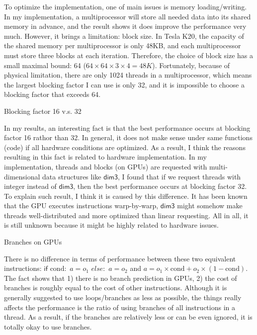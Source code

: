 \documentclass[12pt]{article}
\makeatletter
\renewenvironment{itemize}
{\list{$\bullet$}{\leftmargin\z@ \labelwidth\z@ \itemindent-\leftmargin
\let\makelabel\descriptionlabel}}
{\endlist}
\makeatother
\begin{document}
\begin{itemize}
    \begin{flushleft}
        To optimize the implementation, one of main issues is memory loading/writing. In my implementation, a multiprocessor will store all needed data into its shared memory in advance, and the result shows it does improve the performance very much. However, it brings a limitation: block size. In Tesla K20, the capacity of the shared memory per multiprocessor is only 48KB, and each multiprocessor must store three blocks at each iteration. Therefore, the choice of block size has a small maximal bound: 64 ($64 \times 64 \times 3 \times 4 = 48K$). Fortunately, because of physical limitation, there are only 1024 threads in a multiprocessor, which means the largest blocking factor I can use is only 32, and it is impossible to choose a blocking factor that exceeds 64.
    \end{flushleft}
    \item Blocking factor 16 v.s. 32
    \begin{flushleft}
        In my results, an interesting fact is that the best performance occurs at blocking factor 16 rathor than 32. In general, it does not make sense under same functions (code) if all hardware conditions are optimized. As a result, I think the reasons resulting in this fact is related to hardware implementation. In my implementation, threads and blocks (on GPUs) are requested with multi-dimensional data structures like $\mathsf{dim3}$, I found that if we request threads with integer instead of $\mathsf{dim3}$, then the best performance occurs at blocking factor 32. To explain such result, I think it is caused by this difference. It has been known that the GPU executes instructions warp-by-warp, $\mathsf{dim3}$ might somehow make threads well-distributed and more optimized than linear requesting. All in all, it is still unknown because it might be highly related to hardware issues.
    \end{flushleft}
    \item Branches on GPUs
    \begin{flushleft}
        There is no difference in terms of performance between these two equivalent instructions: $\mathsf{if} \,\, \text{cond}: \,\, a = o_1 \,\, else: \,\, a = o_2$ and $a = o_1 \times \text{cond} + o_2 \times (1-\text{cond})$. The fact shows that 1) there is no branch prediction in GPUs, 2) the cost of branches is roughly equal to the cost of other instructions. Although it is generally suggested to use loops/branches as less as possible, the things really affects the performance is the ratio of using branches of all instructions in a thread. As a result, if the branches are relatively less or can be even ignored, it is totally okay to use branches.
    \end{flushleft}
\end{itemize}
\end{document}
